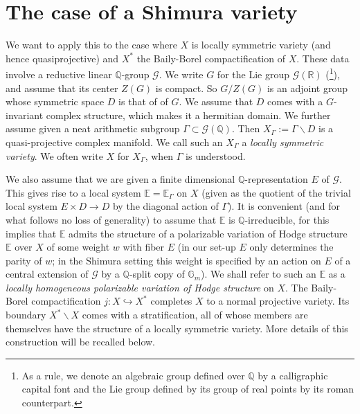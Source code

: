 \documentclass[12pt,letterpaper]{amsart}
\numberwithin{equation}{section}
\def\EE{{\mathbb E}}
\def\GG{{\mathbb G}}
\def\QQ{{\mathbb Q}}
\def\RR{{\mathbb R}}
\def\ssm{\smallsetminus}
\def\G{\Gamma}
\def\bs{\backslash}
\def\Gcal{{\mathcal G}}
\theoremstyle{remark}
\begin{document}
\section{The case of a Shimura variety}

We want to apply this to the case where  $X$ is  locally symmetric variety (and hence 
quasiprojective)  and $X^*$ the  Baily-Borel  compactification of $X$.
These data  involve a reductive linear $\QQ$-group $\Gcal$. We write $G$ for the Lie group $\Gcal(\RR)$ (\footnote{As a rule, we denote an algebraic group defined over 
$\QQ$ by a calligraphic capital font and the Lie group defined by its group of real points by its roman counterpart.}), and assume that its center $Z(G)$ is compact.  So  $G/Z(G)$ is an adjoint group whose  symmetric space $D$ is that of of  $G$. We assume that $D$ comes with a $G$-invariant complex structure, which makes it a  hermitian domain. 
We further assume given  a neat arithmetic subgroup 
$\G\subset \Gcal(\QQ)$. Then $X_\G:=\G\bs D$ is a quasi-projective complex manifold. We call such an $X_\G$ a \emph{locally symmetric variety}. We often write $X$ for $X_\G$, when $\G$ is understood.  

We also assume that we are given  a finite dimensional   $\QQ$-representation $E$ of $\Gcal$. 
This gives rise to a local system $\EE=\EE_\G$ on $X$ (given as the quotient of the trivial local system $E\times D\to D$ by the diagonal action of $\G$).
It is convenient (and for what follows no loss of generality) to assume that $\EE$ is $\QQ$-irreducible, for this implies that  $\EE$ admits the structure of a polarizable variation of Hodge structure $\EE$ over $X$ of some weight $w$ with fiber $E$  (in our set-up $E$ only determines the parity of $w$; in the Shimura setting this weight is specified by an action on $E$ of a  central extension of $\Gcal$ by a $\QQ$-split copy of $\GG_m$). We shall refer to such an $\EE$ as a \emph{locally homogeneous polarizable variation of Hodge structure} on $X$.
The  Baily-Borel compactification $j:X\hookrightarrow X^*$ completes  $X$ to a normal projective variety. Its boundary $X^*\ssm X$ comes with a stratification, all of whose members are themselves have the structure of a locally symmetric variety. More details of this construction will be recalled below.
 
\end{document}
